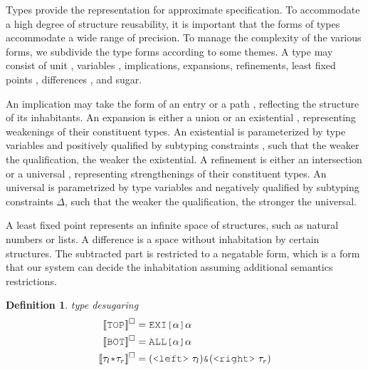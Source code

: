 \documentclass[acmsmall]{acmart}
\theoremstyle{definition}
\newtheorem{definition}{Definition}[section]
\begin{document}
\noindent
Types provide the representation for approximate specification.
To accommodate a high degree of structure reusability,
it is important that the forms of types accommodate a wide range of precision.
To manage the complexity of the various forms, we subdivide the type forms
according to some themes.
A type \ms{\tau} may consist of unit , variables \ms{\alpha}, 
implications, expansions, refinements,
least fixed points ,
differences \ms{\tau \typdiff \eta}, and sugar.


An implication \ms{\kappa} may take the form of  
an entry  or a path \ms{\tau \J{->} \tau},
reflecting the structure of its inhabitants.
An expansion \ms{\phi} is either a union \ms{\tau \J{|} \tau} or 
an existential ,
representing weakenings of their constituent types. 
An existential is parameterized by type variables \ms{\Theta}
and positively qualified by subtyping constraints \ms{\Delta}, 
such that the weaker the qualification, the weaker the existential.
A refinement \ms{\psi} is either an intersection \ms{\tau \J{\&} \tau} or 
a universal ,
representing strengthenings of their constituent types. 
An universal is parametrized by type variables \ms{\Theta} 
and negatively qualified by subtyping constraints $\Delta$,
such that the weaker the qualification, the stronger the universal.


A least fixed point 
represents an infinite space of structures, 
such as natural numbers or lists. 
A difference \ms{\tau \typdiff \eta} is a space without inhabitation by certain structures.
The subtracted part is restricted to a negatable form,
which is a form that our system can decide the inhabitation
assuming additional semantics restrictions.


\begin{definition} 
  \label{def:type_desugaring}
  \emph{type desugaring}
  \hfill 
  \small
  \boxed{\llbracket \gamma \rrbracket^\square = \tau}
  \nopad
  \begin{align*}
    \llbracket \J{TOP} \rrbracket^\square &= \J{EXI[} \alpha \J{]} \alpha
    \\
    \llbracket \J{BOT} \rrbracket^\square &= \J{ALL[} \alpha \J{]} \alpha
    \\
    \llbracket \tau_l \J{*} \tau_r \rrbracket^\square &= (\J{<left>}\ \tau_l)  \J{\&} (\J{<right>}\ \tau_r)
  \end{align*}
\end{definition} 
\end{document}
